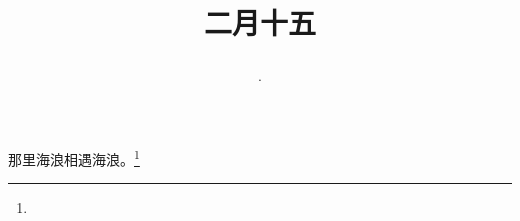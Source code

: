 \title{\date[d=24,m=3,y=2024][year:cn-y,年,month:cn,day:cn,日,·,weekday]·二月十五 }
那里海浪相遇海浪。\footnote{ }

